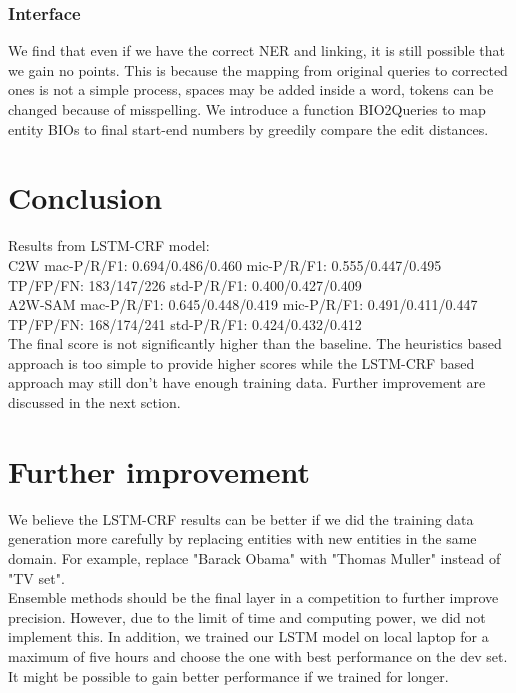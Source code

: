 \documentclass{article}
\begin{document}
\subsubsection{Interface}
We find that even if we have the correct NER and linking, it is still possible that we gain no points. This is because the mapping from original queries to corrected ones is not a simple process, spaces may be added inside a word, tokens can be changed because of misspelling. We introduce a function BIO2Queries to map entity BIOs to final start-end numbers by greedily compare the edit distances.


 
\section{Conclusion}
Results from LSTM-CRF model:\\
C2W	mac-P/R/F1: 0.694/0.486/0.460 mic-P/R/F1: 0.555/0.447/0.495 TP/FP/FN: 183/147/226 std-P/R/F1: 0.400/0.427/0.409 \\
A2W-SAM	mac-P/R/F1: 0.645/0.448/0.419 mic-P/R/F1: 0.491/0.411/0.447 TP/FP/FN: 168/174/241 std-P/R/F1: 0.424/0.432/0.412 \\

The final score is not significantly higher than the baseline.
The heuristics based approach is too simple to provide higher scores while the LSTM-CRF based approach may still don't have enough training data. Further improvement are discussed in the next sction.

\section{Further improvement}
We believe the LSTM-CRF results can be better if we did the training data generation more carefully by replacing entities with new entities in the same domain. For example, replace "Barack Obama" with "Thomas Muller" instead of "TV set".\\
Ensemble methods should be the final layer in a competition to further improve precision. However, due to the limit of time and computing power, we did not implement this. 
In addition, we trained our LSTM model on local laptop for a maximum of five hours and choose the one with best performance on the dev set. It might be possible to gain better performance if we trained for longer.
\end{document}
